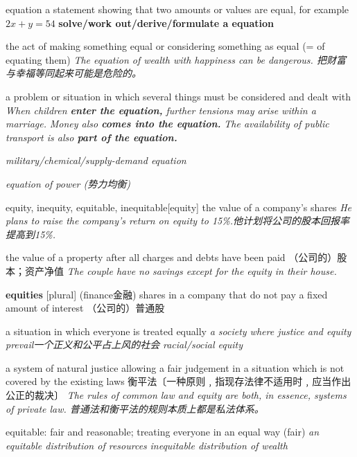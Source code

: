 \begin{DefWord}{equation}
    a statement showing that two amounts or values are equal, for example $2x + y = 54$
    \textbf{solve/work out/derive/formulate a equation}


    the act of making something equal or considering something as equal (= of equating them)
    \textit{The equation of wealth with happiness can be dangerous. 把财富与幸福等同起来可能是危险的。}

    a problem or situation in which several things must be considered and dealt with
    \textit{When children \textbf{enter the equation,} further tensions may arise within a marriage.}
    \textit{Money also \textbf{comes into the equation.}}
    \textit{The availability of public transport is also \textbf{part of the equation.}}

    \textit{military/chemical/supply-demand equation}
    
    \textit{equation of power (势力均衡)}
\end{DefWord}

\begin{DefWord}{equity, inequity, equitable, inequitable}[equity]
    the value of a company's shares
    \textit{He plans to raise the company's return on equity to 15\%.他计划将公司的股本回报率提高到15\%.}

    the value of a property after all charges and debts have been paid （公司的）股本；资产净值
    \textit{The couple have no savings except for the equity in their house.}

    \textbf{equities} [plural] (finance金融) shares in a company that do not pay a fixed amount of interest （公司的）普通股



    a situation in which everyone is treated equally 
    \textit{a society where justice and equity prevail一个正义和公平占上风的社会}
    \textit{racial/social equity}

    a system of natural justice allowing a fair judgement in a situation which is not covered by the existing laws 衡平法〔一种原则﹐指现存法律不适用时﹐应当作出公正的裁决〕
    \textit{The rules of common law and equity are both, in essence, systems of private law. 普通法和衡平法的规则本质上都是私法体系。}

    equitable: fair and reasonable; treating everyone in an equal way (fair)
    \textit{an equitable distribution of resources}
    \textit{inequitable distribution of wealth}
\end{DefWord}

